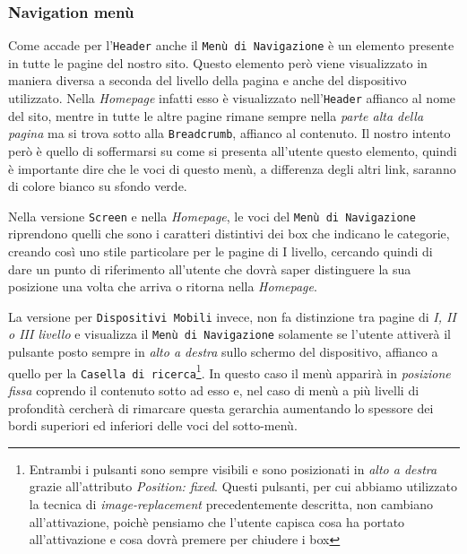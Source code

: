 \subsubsection{Navigation menù}\label{sec:Pres-Nav}
Come accade per l'\texttt{Header} anche il \texttt{Menù di Navigazione} è un elemento presente in tutte le pagine del nostro sito. Questo elemento però viene visualizzato in maniera diversa a seconda del livello della pagina e anche del dispositivo utilizzato. Nella \textit{Homepage} infatti esso è visualizzato nell'\texttt{Header} affianco al nome del sito, mentre in tutte le altre pagine rimane sempre nella \textit{parte alta della pagina} ma si trova sotto alla \texttt{Breadcrumb}, affianco al contenuto. Il nostro intento però è quello di soffermarsi su come si presenta all'utente questo elemento, quindi è importante dire che le voci di questo menù, a differenza degli altri link, saranno di colore bianco su sfondo verde.

Nella versione \texttt{Screen} e nella \textit{Homepage}, le voci del \texttt{Menù di Navigazione} riprendono quelli che sono i caratteri distintivi dei box che indicano le categorie, creando così uno stile particolare per le pagine di I livello, cercando quindi di dare un punto di riferimento all'utente che dovrà saper distinguere la sua posizione una volta che arriva o ritorna nella \textit{Homepage}.

La versione per \texttt{Dispositivi Mobili} invece, non fa distinzione tra pagine di \textit{I, II o III livello} e visualizza il \texttt{Menù di Navigazione} solamente se l'utente attiverà il pulsante posto sempre in \textit{alto a destra} sullo schermo del dispositivo, affianco a quello per la \texttt{Casella di ricerca}\footnote{Entrambi i pulsanti sono sempre visibili e sono posizionati in \textit{alto a destra} grazie all'attributo \textit{Position: fixed}. Questi pulsanti, per cui abbiamo utilizzato la tecnica di \textit{image-replacement} precedentemente descritta, non cambiano all'attivazione, poichè pensiamo che l'utente capisca cosa ha portato all'attivazione e cosa dovrà premere per chiudere i box}. In questo caso il menù apparirà in \textit{posizione fissa} coprendo il contenuto sotto ad esso e, nel caso di menù a più livelli di profondità cercherà di rimarcare questa gerarchia aumentando lo spessore dei bordi superiori ed inferiori delle voci del sotto-menù.

